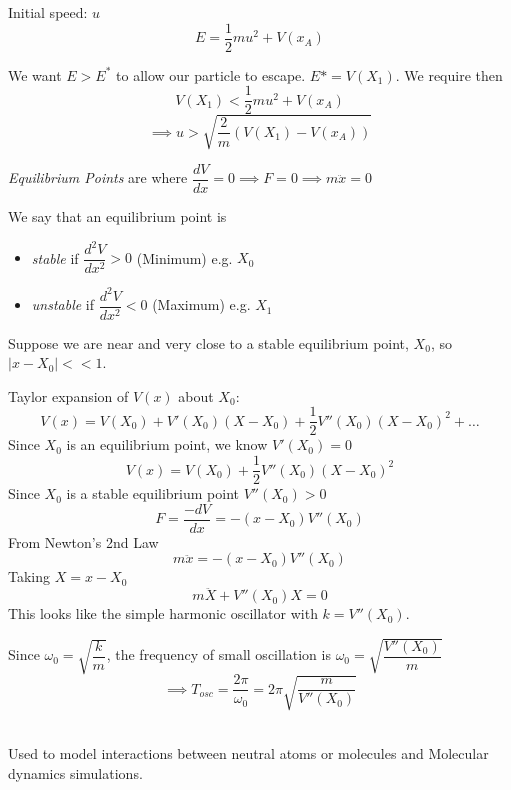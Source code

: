 Initial speed: $u$
\[E = \frac{1}{2}mu^2 + V(x_A)\]

We want $E > E^*$ to allow our particle to escape. $E* = V(X_1)$. We require then 
\[V(X_1) < \frac{1}{2}mu^2 + V(x_A)\]
\[\implies u > \sqrt{\frac{2}{m}(V(X_1)-V(x_A))}\] 

\pagebreak



\begin{definition}
\emph{Equilibrium Points} are where $\dfrac{dV}{dx} = 0 \implies F = 0 \implies m\ddot{x} = 0$

We say that an equilibrium point is 
\begin{itemize}
\item  \emph{stable} if $\dfrac{d^2V}{dx^2} > 0$ (Minimum) e.g. $X_0$ 
\item \emph{unstable} if $\dfrac{d^2V}{dx^2} < 0$ (Maximum) e.g. $X_1$
 \end{itemize}

\end{definition}

Suppose we are near and very close to a stable equilibrium point, $X_0$, so $|x - X_0| << 1$. 

Taylor expansion of $V(x)$ about $X_0$:
\begin{equation}V(x) = V(X_0) + V'(X_0)(X-X_0) + \frac{1}{2}V''(X_0)(X-X_0)^2 + \dots	
\end{equation}
Since $X_0$ is an equilibrium point, we know $V'(X_0) = 0$
\[V(x) = V(X_0)+ \frac{1}{2}V''(X_0)(X-X_0)^2 \]
Since $X_0$ is a stable equilibrium point $V''(X_0) >0$
\[F = \frac{-dV}{dx} = -(x-X_0)V''(X_0)\]
From Newton's 2nd Law
\[m\ddot{x} = -(x-X_0)V''(X_0)\]
Taking $X = x-X_0$
\[m\ddot{X} + V''(X_0)X = 0\]
This looks like the simple harmonic oscillator with $k = V''(X_0)$.

 Since $\omega_0 = \sqrt{\dfrac{k}{m}}$, the frequency of small oscillation is $\omega_0 = \sqrt{\dfrac{V''(X_0)}{m}}$
\[\implies T_{osc} = \frac{2\pi}{\omega_0} = 2\pi \sqrt{\dfrac{m}{V''(X_0)}}\]~

\begin{example}

Used to model interactions between neutral atoms or molecules and Molecular dynamics simulations.
\end{example}








